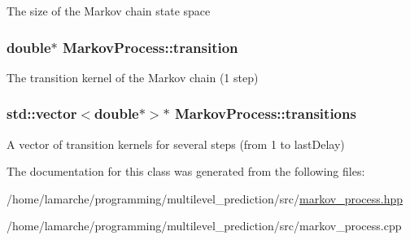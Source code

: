 The size of the Markov chain state space \hypertarget{class_markov_process_aae914f9e4fa973b5515bebc41508a289}{
\subsubsection[{transition}]{\setlength{\rightskip}{0pt plus 5cm}double$\ast$ Markov\-Process\-::transition}}\label{class_markov_process_aae914f9e4fa973b5515bebc41508a289}
The transition kernel of the Markov chain (1 step) \hypertarget{class_markov_process_a16e4250dba911530aff3d2766a367e5b}{
\subsubsection[{transitions}]{\setlength{\rightskip}{0pt plus 5cm}std\-::vector$<$double$\ast$$>$$\ast$ Markov\-Process\-::transitions}}\label{class_markov_process_a16e4250dba911530aff3d2766a367e5b}
A vector of transition kernels for several steps (from 1 to last\-Delay) 

The documentation for this class was generated from the following files\-:\begin{DoxyCompactItemize}
\item 
/home/lamarche/programming/multilevel\-\_\-prediction/src/\hyperlink{markov__process_8hpp}{markov\-\_\-process.\-hpp}\item 
/home/lamarche/programming/multilevel\-\_\-prediction/src/markov\-\_\-process.\-cpp\end{DoxyCompactItemize}
